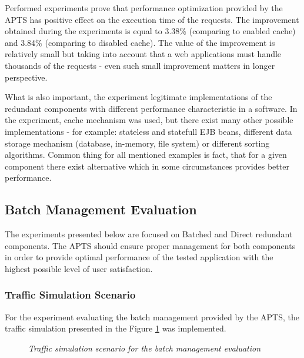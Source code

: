 \documentclass[12pt,a4paper]{article}
\begin{document}
Performed experiments prove that performance optimization provided by the APTS has positive effect on the execution time of the requests. The improvement obtained during the experiments is equal to 3.38\% (comparing to enabled cache) and 3.84\% (comparing to disabled cache). The value of the improvement is relatively small but taking into account that a web applications must handle thousands of the requests - even such small improvement matters in longer perspective.  

What is also important, the experiment legitimate implementations of the redundant components with different performance characteristic in a software. In the experiment, cache mechanism was used, but there exist many other possible implementations - for example: stateless and statefull EJB beans, different data storage mechanism (database, in-memory, file system) or different sorting algorithms. Common thing for all mentioned examples is fact, that for a given component there exist alternative which in some circumstances provides better performance.     

 

\subsection{Batch Management Evaluation}

The experiments presented below are focused on Batched and Direct redundant components. The APTS should ensure proper management for both components in order to provide optimal performance of the tested application with the highest possible level of user satisfaction.  

\subsubsection{Traffic Simulation Scenario} \label{batchsimulationscenario}

For the experiment evaluating the batch management provided by the APTS, the traffic simulation presented in the Figure \ref{trafficbatch} was implemented.

\begin{figure}[!htb]
\begin{center}
\end{center}
\caption{\textit{Traffic simulation scenario for the batch management evaluation}} \label{trafficbatch}
\end{figure}
\end{document}
